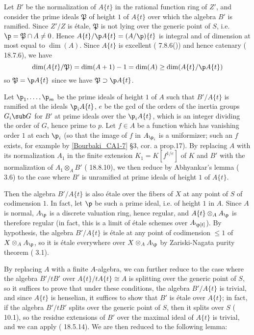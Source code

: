Let $B'$ be the normalization of $A\{t\}$ in the rational function ring of $Z'$, and consider the prime ideals $\mathfrak{P}$ of height $1$ of $A\{t\}$ over which the algebra $B'$ is ramified. Since $Z'/Z$ is \'etale, $\mathfrak{P}$ is not lying over the generic point of $S$, i.e. $\p=\mathfrak{P}\cap A\neq 0$. Hence $A\{t\}/\p A\{t\}=(A/\p)\{t\}$ is integral and of dimension at most equal to $\dim(A)$. Since $A\{t\}$ is excellent (\cite{EGA4-3} 7.8.6()) and hence catenary (\cite{EGA4-4} 18.7.6), we have
\[\dim(A\{t\}/\mathfrak{P})=\dim(A+1)-1=\dim(A)\geq\dim(A\{t\}/\p A\{t\})\]
so $\mathfrak{P}=\p A\{t\}$ since we have $\mathfrak{P}\supset\p A\{t\}$.\par
Let $\p_1,\dots,\p_m$ be the prime ideals of height $1$ of $A$ such that $B'/A\{t\}$ is ramified at the ideals $\p_iA\{t\}$, $e$ be the gcd of the orders of the inertia groups $G_i\sub G$ for $B'$ at prime ideals over the $\p_iA\{t\}$, which is an integer dividing the order of $G$, hence prime to $p$. Let $f\in A$ be a function which has vanishing order $1$ at each $\p_i$ (so that the image of $f$ in $A_{\p_i}$ is a uniformizer; such an $f$ exists, for example by \cref{Bourbaki_CA1-7}  \S 3, cor. a prop.17). By replacing $A$ with its normalization $A_1$ in the finite extension $K_1=K[f^{1/e}]$ of $K$ and $B'$ with the normalization of $A_1\otimes_AB'$ (\cite{EGA4-4} 18.8.10), we then reduce by Abhyankar's lemma (\cite{SGA1}  3.6) to the case where $B'$ is unramified at prime ideals of height $1$ of $A\{t\}$.\par
Then the algebra $B'/A\{t\}$ is also \'etale over the fibers of $X$ at any point of $S$ of codimension $1$. In fact, let $\p$ be such a prime ideal, i.e. of height $1$ in $A$. Since $A$ is normal, $A_\p$ is a discrete valuation ring, hence regular, and $A\{t\}\otimes_AA_\p$ is therefore regular (in fact, this is a limit of \'etale schemes over $A_\p[t]$). By hypothesis, the algebra $B'/A\{t\}$ is \'etale at any point of codimension $\leq 1$ of $X\otimes_AA_\p$, so it is \'etale everywhere over $X\otimes_AA_\p$ by Zariski-Nagata purity theorem (\cite{SGA1}  3.1).\par
By replacing $A$ with a finite $A$-algebra, we can further reduce to the case where the algebra $B'/tB'$ over $A\{t\}/tA\{t\}\cong A$ is splitting over the generic point of $S$, so it suffices to prove that under these conditions, the algebra $B'/A\{t\}$ is trivial, and since $A\{t\}$ is henselian, it suffices to show that $B'$ is \'etale over $A\{t\}$; in fact, if the algebra $B'/tB'$ splits over the generic point of $S$, then it splits over $S$ (\cite{SGA1}  10.1), so the residue extensions of $B'$ over the maximal ideal of $A\{t\}$ is trivial, and we can apply (\cite{EGA4-4} 18.5.14). We are then reduced to the following lemma:

